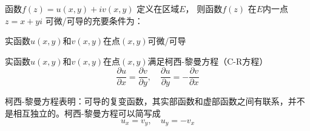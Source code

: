   \begin{theorem}\label{} \index{}
        函数$f(z) = u(x,y) + iv(x,y)$ 定义在区域$E$， 则函数$f(z)$ 在$E$内一点$z = x+y i$ 可微/可导的充要条件为：
        \begin{compactenum}[(i)]
          \item 实函数$u(x,y)$和$v(x,y)$在点$(x,y)$可微/可导  
          \item 实函数$u(x,y)$和$v(x,y)$在点$(x,y)$满足柯西-黎曼方程（C-R方程）
          \begin{equation}
            \frac{\partial u}{\partial x } = \frac{\partial v}{\partial y}, \quad \frac{\partial u}{\partial y } = - \frac{\partial v}{\partial x}
          \end{equation}
        \end{compactenum}
\end{theorem}
柯西-黎曼方程表明：可导的复变函数，其实部函数和虚部函数之间有联系，并不是相互独立的。柯西-黎曼方程可以简写成
\begin{equation}
  u_x= v_y, \quad u_y= - v_x
\end{equation}

